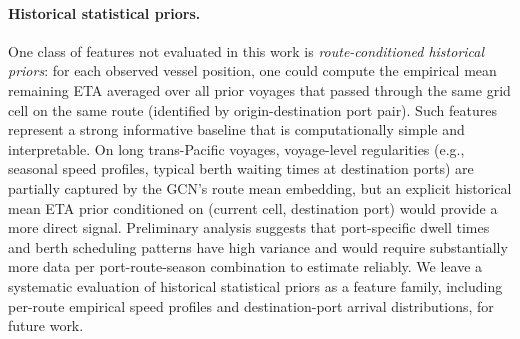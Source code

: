 \documentclass[conference]{IEEEtran}
\begin{document}
\paragraph{Historical statistical priors.}
One class of features not evaluated in this work is \textit{route-conditioned historical priors}: for each observed vessel position, one could compute the empirical mean remaining ETA averaged over all prior voyages that passed through the same grid cell on the same route (identified by origin-destination port pair).
Such features represent a strong informative baseline that is computationally simple and interpretable.
On long trans-Pacific voyages, voyage-level regularities (e.g., seasonal speed profiles, typical berth waiting times at destination ports) are partially captured by the GCN's route mean embedding, but an explicit historical mean ETA prior conditioned on (current cell, destination port) would provide a more direct signal.
Preliminary analysis suggests that port-specific dwell times and berth scheduling patterns have high variance and would require substantially more data per port-route-season combination to estimate reliably.
We leave a systematic evaluation of historical statistical priors as a feature family, including per-route empirical speed profiles and destination-port arrival distributions, for future work.




\end{document}
